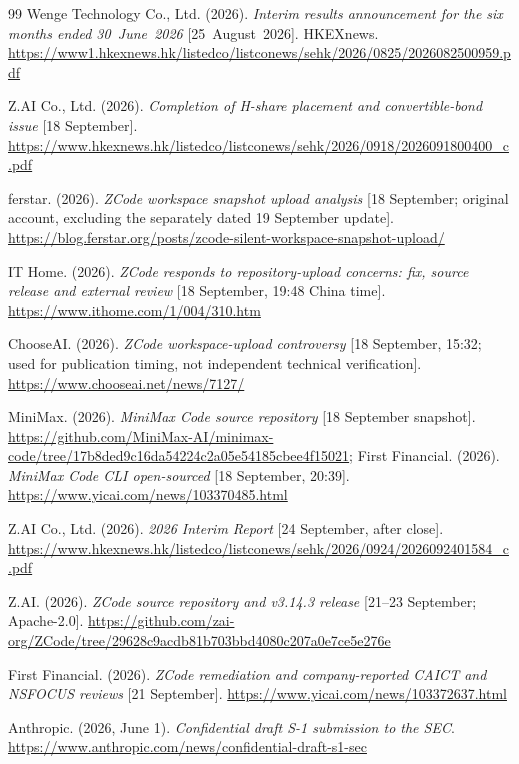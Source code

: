 \documentclass[11pt]{article}
\begin{document}
\begin{thebibliography}{99}
Wenge Technology Co., Ltd. (2026). \emph{Interim results announcement for the six months ended
30~June~2026} [25~August~2026]. HKEXnews.
\url{https://www1.hkexnews.hk/listedco/listconews/sehk/2026/0825/2026082500959.pdf}

Z.AI Co., Ltd. (2026). \emph{Completion of H-share placement and convertible-bond issue} [18 September].
\url{https://www.hkexnews.hk/listedco/listconews/sehk/2026/0918/2026091800400_c.pdf}

ferstar. (2026). \emph{ZCode workspace snapshot upload analysis} [18 September; original account,
excluding the separately dated 19 September update].
\url{https://blog.ferstar.org/posts/zcode-silent-workspace-snapshot-upload/}

IT Home. (2026). \emph{ZCode responds to repository-upload concerns: fix, source release and external review}
[18 September, 19:48 China time]. \url{https://www.ithome.com/1/004/310.htm}

ChooseAI. (2026). \emph{ZCode workspace-upload controversy} [18 September, 15:32; used for
publication timing, not independent technical verification]. \url{https://www.chooseai.net/news/7127/}

MiniMax. (2026). \emph{MiniMax Code source repository} [18 September snapshot].
\url{https://github.com/MiniMax-AI/minimax-code/tree/17b8ded9c16da54224c2a05e54185cbee4f15021};
First Financial. (2026). \emph{MiniMax Code CLI open-sourced} [18 September, 20:39].
\url{https://www.yicai.com/news/103370485.html}


Z.AI Co., Ltd. (2026). \emph{2026 Interim Report} [24 September, after close].
\url{https://www.hkexnews.hk/listedco/listconews/sehk/2026/0924/2026092401584_c.pdf}

Z.AI. (2026). \emph{ZCode source repository and v3.14.3 release} [21--23 September; Apache-2.0].
\url{https://github.com/zai-org/ZCode/tree/29628c9acdb81b703bbd4080c207a0e7ce5e276e}

First Financial. (2026). \emph{ZCode remediation and company-reported CAICT and NSFOCUS reviews} [21 September].
\url{https://www.yicai.com/news/103372637.html}

Anthropic. (2026, June 1). \emph{Confidential draft S-1 submission to the SEC}.
\url{https://www.anthropic.com/news/confidential-draft-s1-sec}


\end{thebibliography}
\end{document}
